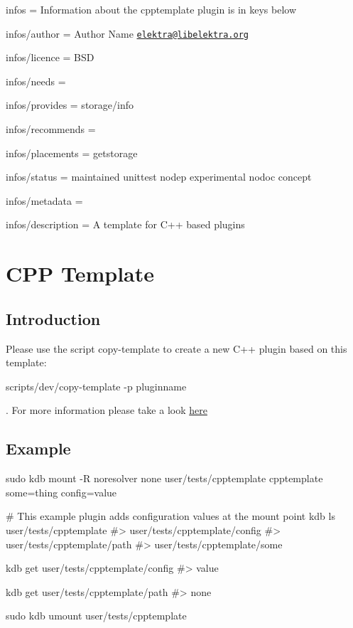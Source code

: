 
\begin{DoxyItemize}
\item infos = Information about the cpptemplate plugin is in keys below
\item infos/author = Author Name \href{mailto:elektra@libelektra.org}{\tt elektra@libelektra.\+org}
\item infos/licence = B\+SD
\item infos/needs =
\item infos/provides = storage/info
\item infos/recommends =
\item infos/placements = getstorage
\item infos/status = maintained unittest nodep experimental nodoc concept
\item infos/metadata =
\item infos/description = A template for C++ based plugins
\end{DoxyItemize}\hypertarget{autotoc_md108_src_plugins_cpptemplate_README_md}{}\section{C\+P\+P Template}\label{autotoc_md108_src_plugins_cpptemplate_README_md}
\hypertarget{autotoc_md108_autotoc_md109}{}\subsection{Introduction}\label{autotoc_md108_autotoc_md109}
Please use the script copy-\/template to create a new C++ plugin based on this template\+:


\begin{DoxyCode}
scripts/dev/copy-template -p pluginname
\end{DoxyCode}


. For more information please take a look \hyperlink{autotoc_md685_src_plugins_template_README_md}{here}\hypertarget{autotoc_md108_autotoc_md110}{}\subsection{Example}\label{autotoc_md108_autotoc_md110}

\begin{DoxyCode}
sudo kdb mount -R noresolver none user/tests/cpptemplate cpptemplate some=thing config=value

# This example plugin adds configuration values at the mount point
kdb ls user/tests/cpptemplate
#> user/tests/cpptemplate/config
#> user/tests/cpptemplate/path
#> user/tests/cpptemplate/some

kdb get user/tests/cpptemplate/config
#> value

kdb get user/tests/cpptemplate/path
#> none

sudo kdb umount user/tests/cpptemplate
\end{DoxyCode}
 
